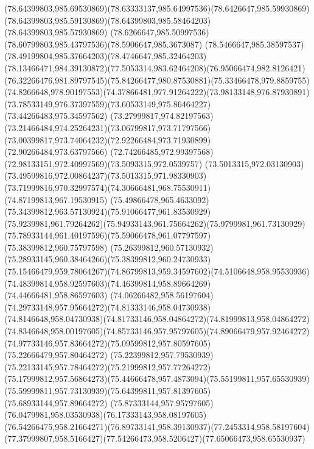 {    \curveto(78.64399803,985.69530869)(78.63333137,985.64997536)(78.6426647,985.59930869)
    \curveto(78.64399803,985.59130869)(78.64399803,985.58464203)(78.64399803,985.57930869)
    \curveto(78.6266647,985.50997536)(78.60799803,985.43797536)(78.5906647,985.3673087)
    \curveto(78.5466647,985.38597537)(78.49199804,985.37664203)(78.4746647,985.32464203)
    \curveto(78.13466471,984.39130872)(77.5053314,983.62464208)(76.95066474,982.8126421)
    \curveto(76.32266476,981.89797545)(75.84266477,980.87530881)(75.33466478,979.8859755)
    \curveto(74.8266648,978.90197553)(74.37866481,977.91264222)(73.98133148,976.87930891)
    \curveto(73.78533149,976.37397559)(73.60533149,975.86464227)(73.44266483,975.34597562)
    \curveto(73.27999817,974.82197563)(73.21466484,974.25264231)(73.06799817,973.71797566)
    \curveto(73.00399817,973.74064232)(72.92266484,973.71930899)(72.90266484,973.63797566)
    \curveto(72.74266485,972.99397568)(72.98133151,972.40997569)(73.5093315,972.0539757)
    \curveto(73.5013315,972.03130903)(73.49599816,972.00864237)(73.5013315,971.98330903)
    \curveto(73.71999816,970.32997574)(74.30666481,968.75530911)(74.87199813,967.19530915)
    \curveto(75.49866478,965.4633092)(75.34399812,963.57130924)(75.91066477,961.83530929)
    \curveto(75.9239981,961.79264262)(75.94933143,961.75664262)(75.9799981,961.73130929)
    \curveto(75.78933144,961.40197596)(75.59066478,961.07797597)(75.38399812,960.75797598)
    \curveto(75.26399812,960.57130932)(75.28933145,960.38464266)(75.38399812,960.24730933)
    \curveto(75.15466479,959.78064267)(74.86799813,959.34597602)(74.5106648,958.95530936)
    \curveto(74.48399814,958.92597603)(74.46399814,958.89664269)(74.44666481,958.86597603)
    \curveto(74.06266482,958.56197604)(74.29733148,957.95664272)(74.81333146,958.04730938)
    \curveto(74.8146648,958.04730938)(74.81733146,958.04864272)(74.81999813,958.04864272)
    \curveto(74.8346648,958.00197605)(74.85733146,957.95797605)(74.89066479,957.92464272)
    \curveto(74.97733146,957.83664272)(75.09599812,957.80597605)(75.22666479,957.80464272)
    \curveto(75.22399812,957.79530939)(75.22133145,957.78464272)(75.21999812,957.77264272)
    \curveto(75.17999812,957.56864273)(75.44666478,957.4873094)(75.55199811,957.65530939)
    \curveto(75.59999811,957.73130939)(75.64399811,957.81397605)(75.68933144,957.89664272)
    \curveto(75.87333144,957.95797605)(76.0479981,958.03530938)(76.17333143,958.08197605)
    \curveto(76.54266475,958.21664271)(76.89733141,958.39130937)(77.2453314,958.58197604)
    \curveto(77.37999807,958.5166427)(77.54266473,958.5206427)(77.65066473,958.65530937)
}
